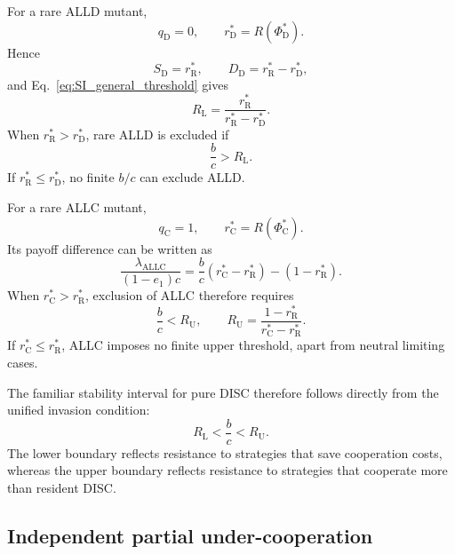 \documentclass[fleqn,10pt]{wlscirep}
\begin{document}
For a rare ALLD mutant,
\begin{equation}
q_\mathrm D=0,
\qquad
r_\mathrm D^*=R(\Phi_\mathrm D^*).
\end{equation}
Hence
\begin{equation}
S_\mathrm D=r_\mathrm R^*,
\qquad
D_\mathrm D=r_\mathrm R^*-r_\mathrm D^*,
\end{equation}
and Eq.~\eqref{eq:SI_general_threshold} gives
\begin{equation}
R_\mathrm L
=
\frac{r_\mathrm R^*}{r_\mathrm R^*-r_\mathrm D^*}.
\label{eq:SI_RL}
\end{equation}
When $r_\mathrm R^*>r_\mathrm D^*$, rare ALLD is excluded if
\begin{equation}
\frac{b}{c}>R_\mathrm L.
\label{eq:SI_ALLD_condition}
\end{equation}
If $r_\mathrm R^*\le r_\mathrm D^*$, no finite $b/c$ can exclude ALLD.

For a rare ALLC mutant,
\begin{equation}
q_\mathrm C=1,
\qquad
r_\mathrm C^*=R(\Phi_\mathrm C^*).
\end{equation}
Its payoff difference can be written as
\begin{equation}
\frac{\lambda_{\mathrm{ALLC}}}{(1-e_1)c}
=
\frac{b}{c}(r_\mathrm C^*-r_\mathrm R^*)
-
(1-r_\mathrm R^*).
\end{equation}
When $r_\mathrm C^*>r_\mathrm R^*$, exclusion of ALLC therefore requires
\begin{equation}
\frac{b}{c}
<
R_\mathrm U,
\qquad
R_\mathrm U
=
\frac{1-r_\mathrm R^*}{r_\mathrm C^*-r_\mathrm R^*}.
\label{eq:SI_RU}
\end{equation}
If $r_\mathrm C^*\le r_\mathrm R^*$, ALLC imposes no finite upper threshold, apart from neutral limiting cases.

The familiar stability interval for pure DISC therefore follows directly from the unified invasion condition:
\begin{equation}
\boxed{
R_\mathrm L
<
\frac{b}{c}
<
R_\mathrm U
}.
\label{eq:SI_DISC_window}
\end{equation}
The lower boundary reflects resistance to strategies that save cooperation costs, whereas the upper boundary reflects resistance to strategies that cooperate more than resident DISC.

\subsection{Independent partial under-cooperation}
\label{sec:si-iid-opportunism}
\end{document}
